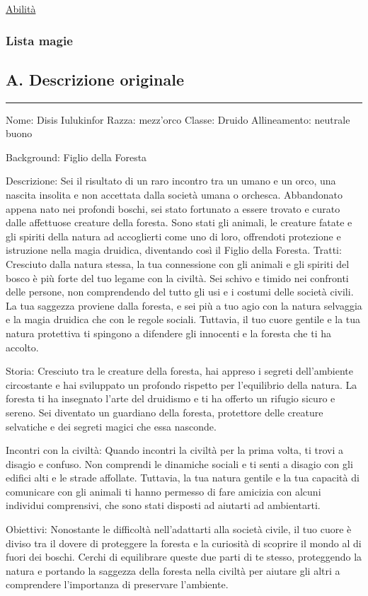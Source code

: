 \href{Abilita\%CC\%80\%202419083f5ad842df8e9e10b59a312f2e.csv}{Abilità}

\subsubsection{Lista magie}\label{lista-magie}

\subsection{A. Descrizione originale}\label{a.-descrizione-originale}

\begin{center}\rule{0.5\linewidth}{0.5pt}\end{center}

Nome: Disis Iulukinfor Razza: mezz'orco Classe: Druido Allineamento:
neutrale buono

Background: Figlio della Foresta

Descrizione: Sei il risultato di un raro incontro tra un umano e un
orco, una nascita insolita e non accettata dalla società umana o
orchesca. Abbandonato appena nato nei profondi boschi, sei stato
fortunato a essere trovato e curato dalle affettuose creature della
foresta. Sono stati gli animali, le creature fatate e gli spiriti della
natura ad accoglierti come uno di loro, offrendoti protezione e
istruzione nella magia druidica, diventando così il Figlio della
Foresta. Tratti: Cresciuto dalla natura stessa, la tua connessione con
gli animali e gli spiriti del bosco è più forte del tuo legame con la
civiltà. Sei schivo e timido nei confronti delle persone, non
comprendendo del tutto gli usi e i costumi delle società civili. La tua
saggezza proviene dalla foresta, e sei più a tuo agio con la natura
selvaggia e la magia druidica che con le regole sociali. Tuttavia, il
tuo cuore gentile e la tua natura protettiva ti spingono a difendere gli
innocenti e la foresta che ti ha accolto.

Storia: Cresciuto tra le creature della foresta, hai appreso i segreti
dell'ambiente circostante e hai sviluppato un profondo rispetto per
l'equilibrio della natura. La foresta ti ha insegnato l'arte del
druidismo e ti ha offerto un rifugio sicuro e sereno. Sei diventato un
guardiano della foresta, protettore delle creature selvatiche e dei
segreti magici che essa nasconde.

Incontri con la civiltà: Quando incontri la civiltà per la prima volta,
ti trovi a disagio e confuso. Non comprendi le dinamiche sociali e ti
senti a disagio con gli edifici alti e le strade affollate. Tuttavia, la
tua natura gentile e la tua capacità di comunicare con gli animali ti
hanno permesso di fare amicizia con alcuni individui comprensivi, che
sono stati disposti ad aiutarti ad ambientarti.

Obiettivi: Nonostante le difficoltà nell'adattarti alla società civile,
il tuo cuore è diviso tra il dovere di proteggere la foresta e la
curiosità di scoprire il mondo al di fuori dei boschi. Cerchi di
equilibrare queste due parti di te stesso, proteggendo la natura e
portando la saggezza della foresta nella civiltà per aiutare gli altri a
comprendere l'importanza di preservare l'ambiente.
